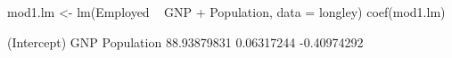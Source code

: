 \begin{Schunk}
\begin{Sinput}
 mod1.lm <- lm(Employed ~ GNP + Population, data = longley)
 coef(mod1.lm)
\end{Sinput}
\begin{Soutput}
(Intercept)         GNP  Population 
88.93879831  0.06317244 -0.40974292 
\end{Soutput}
\end{Schunk}
